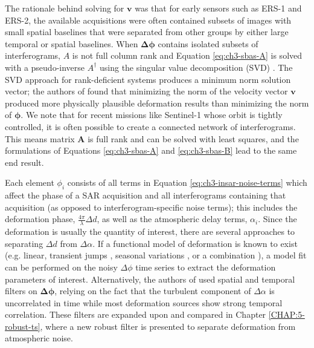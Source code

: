The rationale behind solving for $\bm{v}$ was that for early sensors such as ERS-1 and ERS-2, the available acquisitions were often contained subsets of images with small spatial baselines that were separated from other groups by either large temporal or spatial baselines. 
When $\bm{\Delta \phi}$ contains isolated subsets of interferograms, $A$ is not full column rank and Equation \eqref{eq:ch3-sbas-A} is solved with a pseudo-inverse $A^{\dagger}$ using the singular value decomposition (SVD) \citep{Strang2006LinearAlgebraIts}. The SVD approach for rank-deficient systems produces a minimum norm solution vector; the authors of \cite{Berardino2002NewAlgorithmSurface} found that minimizing the norm of the velocity vector $ \bm{v} $ produced more physically plausible deformation results than minimizing the norm of $ \bm{\phi} $. We note that for recent missions like Sentinel-1 whose orbit is tightly controlled, it is often possible to create a connected network of interferograms. This means matrix $ \bm{A} $ is full rank and can be solved with least squares, and the formulations of Equations \eqref{eq:ch3-sbas-A} and \eqref{eq:ch3-sbas-B} lead to the same end result.


Each element $\phi_i$ consists of all terms in Equation \eqref{eq:ch3-insar-noise-terms} which affect the phase of a SAR acquisition and all interferograms containing that acquisition (as opposed to interferogram-specific noise terms); this includes the deformation phase, $\frac{4 \pi}{\lambda} \Delta d$, as well as the atmospheric delay terms, $\alpha_i$.
Since the deformation is usually the quantity of interest, there are several approaches to separating $ \Delta d $ from $\Delta \alpha$.
If a functional model of deformation is known to exist (e.g. linear, transient jumps \citep{Chen20142010SlowSlip, Fielding2017SurfaceDeformationNorth}, seasonal variations \citep{Murray2018ShortLivedPause}, or a combination \citep{Riel2018QuantifyingGroundDeformation}), a model fit can be performed on the noisy $ \Delta \phi $ time series to extract the deformation parameters of interest.
Alternatively, the authors of \cite{Berardino2002NewAlgorithmSurface} used spatial and temporal filters on $\bm{\Delta \phi}$, relying on the fact that the turbulent component of $\Delta \alpha$ is uncorrelated in time \citep{Emardson2003NeutralAtmosphericDelay} while most deformation sources show strong temporal correlation.
These filters are expanded upon and compared in Chapter \ref{CHAP:5-robust-ts}, where a new robust filter is presented to separate deformation from atmospheric noise.

